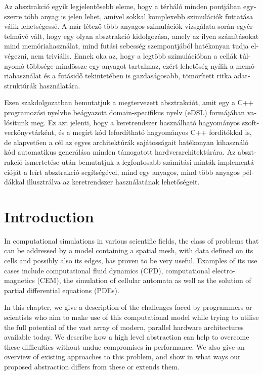 \documentclass[fontsize=11pt, appendixprefix=true]{scrreprt}
\begin{document}
\begin{otherlanguage}{magyar}
Az absztrakció egyik legjelentősebb eleme, hogy a térháló minden pontjában
egyszerre több anyag is jelen lehet, amivel sokkal komplexebb szimulációk
futtatása válik lehetségessé. A már létező több anyagos szimulációk vizsgálata
során egyértelművé vált, hogy egy olyan absztrakció kidolgozása, amely az ilyen
számításokat mind memóriahasználat, mind futási sebesség szempontjából
hatékonyan tudja elvégezni, nem triviális. Ennek oka az, hogy a legtöbb
szimulációban a cellák túlnyomó többsége mindössze egy anyagot tartalmaz, ezért
lehetőség nyílik a memóriahasználat és a futásidő tekintetében is gazdaságosabb,
tömörített ritka adatstruktúrák használatára.

Ezen szakdolgozatban bemutatjuk a megtervezett absztrakciót, amit egy a C++
programozási nyelvbe beágyazott domain-specifikus nyelv (eDSL) formájában
valósítunk meg. Ez azt jelenti, hogy a keretrendszer használható hagyományos
szoftverkönyvtárként, és a megírt kód lefordítható hagyományos C++ fordítókkal
is, de alapvetően a cél az egyes architektúrák sajátosságait hatékonyan
kihasználó kód automatikus generálása minden támogatott hardverarchitektúrára.
Az absztrakció ismertetése után bemutatjuk a legfontosabb számítási minták
implementációját a leírt absztrakció segítségével, mind egy anyagos, mind több
anyagos példákkal illusztrálva az keretrendszer használatának lehetőségeit.
\end{otherlanguage}

\chapter{Introduction}

In computational simulations in various scientific fields, the class of problems
that can be addressed by a model containing a spatial mesh, with data defined on
its cells and possibly also its edges, has proven to be very useful. Examples of
its use cases include computational fluid dynamics (CFD), computational
electro-magnetics (CEM), the simulation of cellular automata as well as the
solution of partial differential equations (PDEs).

In this chapter, we give a description of the challenges faced by programmers or
scientists who aim to make use of this computational model while trying to
utilise the full potential of the vast array of modern, parallel hardware
architectures available today. We describe how a high level abstraction can help
to overcome these difficulties without undue compromises in performance. We also
give an overview of existing approaches to this problem, and show in what ways
our proposed abstraction differs from these or extends them.
\end{document}
